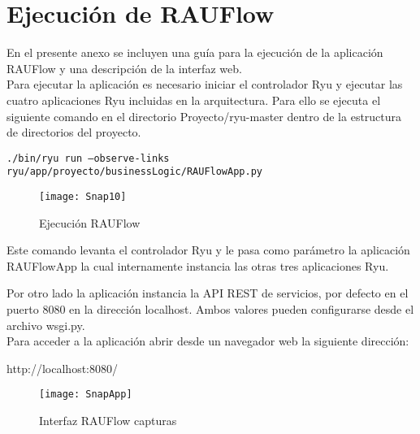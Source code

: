 
\chapter{Ejecuci\'on de RAUFlow}
\label{appendix5}

\ifpdf
    \graphicspath{{Appendix5/Figs/Raster/}{Appendix5/Figs/PDF/}{Appendix5/Figs/}}
\else
    \graphicspath{{Appendix5/Figs/Vector/}{Appendix5/Figs/}}
\fi

En el presente anexo se incluyen una guía para la ejecuci\'on de la aplicaci\'on RAUFlow y una descripción de la interfaz web.\\

Para ejecutar la aplicaci\'on es necesario iniciar el controlador Ryu y ejecutar las cuatro aplicaciones Ryu incluidas en la arquitectura. Para ello se ejecuta el siguiente comando en el directorio Proyecto/ryu-master dentro de la estructura de directorios del proyecto.

\begin{center}
\texttt{./bin/ryu run --observe-links ryu/app/proyecto/businessLogic/RAUFlowApp.py}
\end{center}

\begin{figure}[h] 
\centering    
\texttt{[image: Snap10]}
\caption[Ejecuci\'on RAUFlow]{Ejecuci\'on RAUFlow}
\label{fig:Img2}
\end{figure}

Este comando levanta el controlador Ryu y le pasa como parámetro la aplicaci\'on RAUFlowApp la cual internamente instancia las otras tres aplicaciones Ryu.

Por otro lado la aplicaci\'on instancia la API REST de servicios, por defecto en el puerto 8080 en la direcci\'on localhost. Ambos valores pueden configurarse desde el archivo wsgi.py.\\

Para acceder a la aplicaci\'on abrir desde un navegador web la siguiente direcci\'on:

\begin{center}
http://localhost:8080/
\end{center}


\begin{figure}[ht!] 
\centering    
\texttt{[image: SnapApp]}
\caption[Interfaz RAUFlow capturas]{Interfaz RAUFlow capturas}
\label{fig:Img2}
\end{figure}